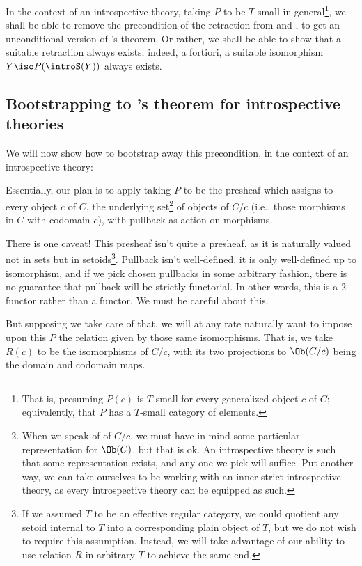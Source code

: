 In the context of an introspective theory, taking $P$ to be $T$-small in general\footnote{That is, presuming $P(c)$ is $T$-small for every generalized object $c$ of $C$; equivalently, that $P$ has a $T$-small category of elements.}, we shall be able to remove the precondition of the retraction from  and , to get an unconditional version of \Loeb's theorem. Or rather, we shall be able to show that a suitable retraction always exists; indeed, a fortiori, a suitable isomorphism $Y \iso P(\introS(Y))$ always exists.

\subsection{Bootstrapping to \Loeb's theorem for introspective theories}
We will now show how to bootstrap away this precondition, in the context of an introspective theory:

Essentially, our plan is to apply  taking $P$ to be the presheaf which assigns to every object $c$ of $C$, the underlying set\footnote{When we speak of  of $C/c$, we must have in mind some particular representation for $\Ob(C)$, but that is ok. An introspective theory is such that some representation exists, and any one we pick will suffice. Put another way, we can take ourselves to be working with an inner-strict introspective theory, as every introspective theory can be equipped as such.} of objects of $C/c$ (i.e., those morphisms in $C$ with codomain $c$), with pullback as action on morphisms.

There is one caveat! This presheaf isn't quite a presheaf, as it is naturally valued not in sets but in setoids\footnote{If we assumed $T$ to be an effective regular category, we could quotient any setoid internal to $T$ into a corresponding plain object of $T$, but we do not wish to require this assumption. Instead, we will take advantage of our ability to use relation $R$ in arbitrary $T$ to achieve the same end.}. Pullback isn't well-defined, it is only well-defined up to isomorphism, and if we pick chosen pullbacks in some arbitrary fashion, there is no guarantee that pullback will be strictly functorial. In other words, this is a 2-functor rather than a functor. We must be careful about this.

But supposing we take care of that, we will at any rate naturally want to impose upon this $P$ the relation given by those same isomorphisms. That is, we take $R(c)$ to be the isomorphisms of $C/c$, with its two projections to $\Ob(C/c)$ being the domain and codomain maps.


